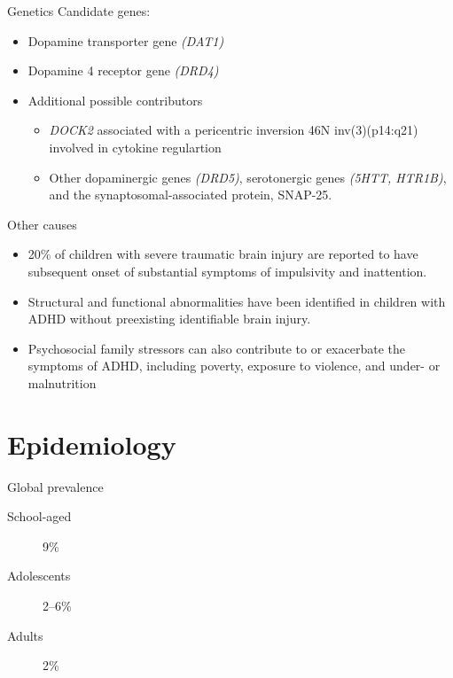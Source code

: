 \documentclass{beamer}
\begin{document}
\begin{frame}{Genetics}
Candidate genes:

\begin{itemize}
    \item Dopamine transporter gene \textit{(DAT1)}
    \item Dopamine 4 receptor gene \textit{(DRD4)}
    \item Additional possible contributors
    \begin{itemize}
        \item \textit{DOCK2} associated with a pericentric inversion 46N
            inv(3)(p14:q21) involved in cytokine regulartion
        \item Other dopaminergic genes \textit{(DRD5)},
            serotonergic genes \textit{(5HTT, HTR1B)},
            and the synaptosomal-associated protein, SNAP-25.
    \end{itemize}
\end{itemize}
\end{frame}

\begin{frame}{Other causes}
\begin{itemize}
    \item 20\% of children with severe traumatic brain injury are reported to
    have subsequent onset of substantial symptoms of impulsivity and
    inattention.

    \item Structural and functional abnormalities have been identified in
    children with ADHD without preexisting identifiable brain injury.

    \item Psychosocial family stressors can also contribute to or exacerbate
    the symptoms of ADHD, including poverty, exposure to violence, and under-
    or malnutrition
\end{itemize}
\end{frame}

\section{Epidemiology}
\begin{frame}{Global prevalence}
\begin{description}
    \item[School-aged] 9\%
    \item[Adolescents] 2--6\%
    \item[Adults] 2\%
\end{description}
\end{frame}
\end{document}
